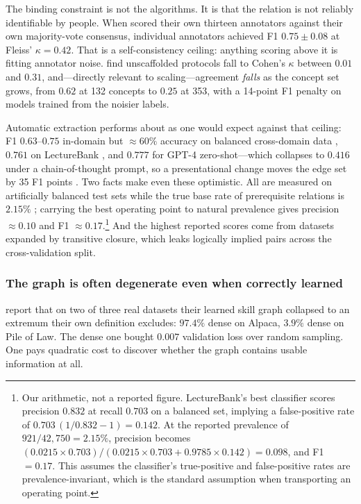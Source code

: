 \documentclass[11pt]{article}
\theoremstyle{plain}
\theoremstyle{definition}
\theoremstyle{remark}
\begin{document}
The binding constraint is not the algorithms. It is that the relation is not
reliably identifiable by people. When \citet{liang2017recovering} scored their
own thirteen annotators against their own majority-vote consensus, individual
annotators achieved F1 $0.75 \pm 0.08$ at Fleiss' $\kappa = 0.42$. That is a
self-consistency ceiling: anything scoring above it is fitting annotator noise.
\citet{alzetta2023annotation} find unscaffolded protocols fall to Cohen's $\kappa$
between $0.01$ and $0.31$, and---directly relevant to scaling---agreement
\emph{falls} as the concept set grows, from $0.62$ at 132 concepts to $0.25$ at
353, with a 14-point F1 penalty on models trained from the noisier labels.

Automatic extraction performs about as one would expect against that ceiling:
F1 $0.63$--$0.75$ in-domain but ${\approx}60\%$ accuracy on balanced cross-domain
data \citep{liang2015measuring}, $0.761$ on LectureBank \citep{li2019lecturebank},
and $0.777$ for GPT-4 zero-shot---which collapses to $0.416$ under a
chain-of-thought prompt, so a presentational change moves the edge set by 35 F1
points \citep{yang2024cgprompt}. Two facts make even these optimistic. All are
measured on artificially balanced test sets while the true base rate of
prerequisite relations is $2.15\%$ \citep{li2019lecturebank}; carrying the best
operating point to natural prevalence gives precision ${\approx}0.10$ and F1
${\approx}0.17$.\footnote{Our arithmetic, not a reported figure. LectureBank's
best classifier scores precision $0.832$ at recall $0.703$ on a balanced set,
implying a false-positive rate of $0.703\,(1/0.832 - 1) = 0.142$. At the reported
prevalence of $921/42{,}750 = 2.15\%$, precision becomes $(0.0215 \times 0.703) /
(0.0215 \times 0.703 + 0.9785 \times 0.142) = 0.098$, and F1 $= 0.17$. This
assumes the classifier's true-positive and false-positive rates are
prevalence-invariant, which is the standard assumption when transporting an
operating point.} And the highest reported scores come from datasets expanded by
transitive closure, which leaks logically implied pairs across the
cross-validation split.

\subsubsection{The graph is often degenerate even when correctly learned}

\citet{chen2023skillit} report that on two of three real datasets their learned
skill graph collapsed to an extremum their own definition excludes: $97.4\%$
dense on Alpaca, $3.9\%$ dense on Pile of Law. The dense one bought $0.007$
validation loss over random sampling. One pays quadratic cost to discover whether
the graph contains usable information at all.
\end{document}
